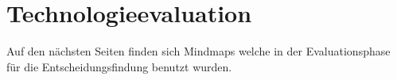 \chapter{Technologieevaluation}
\label{sec:appendix-technology-evaluation}

Auf den nächsten Seiten finden sich Mindmaps welche in der Evaluationsphase
für die Entscheidungsfindung benutzt wurden.


